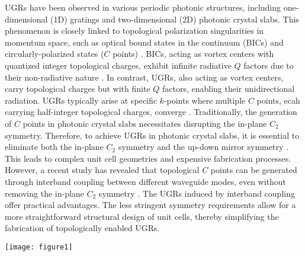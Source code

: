 \documentclass[%
 reprint,
superscriptaddress,
 amsmath,amssymb, aps,
]{revtex4-1}
\begin{document}
UGRs have been observed in various periodic photonic structures, including one-dimensional (1D) gratings and two-dimensional (2D) photonic crystal slabs. This phenomenon is closely linked to topological polarization singularities in momentum space, such as optical bound states in the continuum (BICs) \cite{Marinica2008,Plotnik2011,Hsu2016,Bulgakov2017,Koshelev2018,Koshelev2019,SGLee2019-1,WLiu2019,TYoda2020,SGLee2021-1} and circularly-polarized states ($C$ points) \cite{Schoonover2006,MBurresi2009,Fosel2017}. BICs, acting as vortex centers with quantized integer topological charges, exhibit infinite radiative $Q$ factors due to their non-radiative nature \cite{BZhen2014,Doeleman2018,JJin2019,MKang2022-1,SGLee2023}. In contrast, UGRs, also acting as vortex centers, carry topological charges but with finite $Q$ factors, enabling their unidirectional radiation. UGRs typically arise at specific $k$-points where multiple $C$ points, ecah carrying half-integer topological charges, converge \cite{XYin2020,YZeng2021}. Traditionally, the generation of $C$ points in photonic crystal slabs necessitates disrupting the in-plane $C_2$ symmetry. Therefore, to achieve UGRs in photonic crystal slabs, it is essential to eliminate both the in-plane $C_2$ symmetry and the up-down mirror symmetry \cite{XYin2020}. This leads to complex unit cell geometries and expensive fabrication processes. However, a recent study has revealed that topological $C$ points can be generated through interband coupling between different waveguide modes, even without removing the in-plane $C_2$ symmetry \cite{XYin2023}. The UGRs induced by interband coupling offer practical advantages. The less stringent symmetry requirements allow for a more straightforward structural design of unit cells, thereby simplifying the fabrication of topologically enabled UGRs.

\begin{figure*}[]
\centering\texttt{[image: figure1]}
\caption {\label{fig1} (a) Schematic representation of a homogeneous dielectric waveguide and a ZCG with broken up-down mirror symmetry. While leaky modes in the ZCG are characterized by complex eigenfrequencies due to continuous electromagnetic energy loss, the guided modes in the homogeneous waveguide exhibit real eigenfrequencies, indicating energy conservation within the system. (b) Dispersion curves for $\mathrm{TE}_{0}$ and $\mathrm{TE}_{1}$ modes in a homogeneous dielectric waveguide. The insets with blue and red colors depict the spatial distribution of electric fields for the even and odd modes. (c) A conceptual illustration of photonic band structures for a ZCG. Interband coupling between an even-like $\mathrm{TE}_{0}$ mode and an odd-like $\mathrm{TE}_{1}$ mode gives rise to the interesting topological physical phenomena in the region marked with a red circle.}
\end{figure*}
\end{document}
